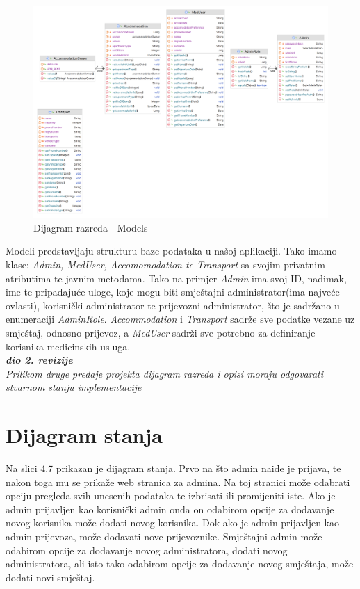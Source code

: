 			\begin{figure}[H]
				\includegraphics[width=\textwidth]{slike/domain.PNG}
				\caption{Dijagram razreda - Models}
				\label{domainDiagram}
			\end{figure}
			
			{Modeli predstavljaju strukturu baze podataka u našoj aplikaciji. Tako imamo klase: \textit{Admin, MedUser, Accomomodation te Transport} sa svojim privatnim atributima te javnim metodama. Tako na primjer \textit{Admin} ima svoj ID, nadimak, ime te pripadajuće uloge, koje mogu biti smještajni administrator(ima najveće ovlasti), korisnički administrator te prijevozni administrator, što je sadržano u enumeraciji \textit{AdminRole}. \textit{Accommodation} i \textit{Transport} sadrže sve podatke vezane uz smještaj, odnosno prijevoz, a \textit{MedUser} sadrži sve potrebno za definiranje korisnika medicinskih usluga. }\\
			
			
			
			\textbf{\textit{dio 2. revizije}}\\			
			
			\textit{Prilikom druge predaje projekta dijagram razreda i opisi moraju odgovarati stvarnom stanju implementacije}
			
			
			
			\eject
		
		\section{Dijagram stanja}
			
			{Na slici 4.7 prikazan je dijagram stanja. Prvo na što admin naiđe je prijava, te nakon toga mu se prikaže web stranica za admina. Na toj stranici može odabrati opciju pregleda svih unesenih podataka te izbrisati ili promijeniti iste. Ako je admin prijavljen kao korisnički admin onda on odabirom opcije za 
			dodavanje novog korisnika može dodati novog korisnika. Dok ako je admin prijavljen kao admin prijevoza, može dodavati nove prijevoznike. Smještajni admin može odabirom opcije za dodavanje novog administratora, dodati novog administratora, ali isto tako odabirom opcije za dodavanje novog smještaja, može dodati novi smještaj.  }
			
